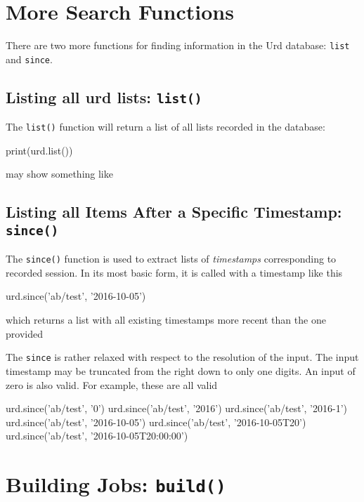 \section{More Search Functions}
\label{sec:more_urd_search}

There are two more functions for finding information in the Urd
database: \texttt{list} and \texttt{since}.


\subsection{Listing all urd lists:  \texttt{list()}}
The \texttt{list()} function will return a list of all lists recorded in
the database:
\begin{python}
print(urd.list())
\end{python}
may show something like
\begin{shell}
\end{shell}


\subsection{Listing all Items After a Specific Timestamp:  \texttt{since()}}
The \texttt{since()} function is used to extract lists of \textsl{timestamps}
corresponding to recorded session.  In its most basic form, it is called
with a timestamp like this
\begin{python}
urd.since('ab/test', '2016-10-05')
\end{python}
which returns a list with all existing timestamps more recent than the
one provided
\begin{shell}
['2016-10-06', '2016-10-07', '2016-10-08', '2016-10-09', '2016-10-09T20']
\end{shell}
The \texttt{since} is rather relaxed with respect to the resolution of
the input.  The input timestamp may be truncated from the right down
to only one digits.  An input of zero is also valid.  For example,
these are all valid
\begin{python}
urd.since('ab/test', '0')
urd.since('ab/test', '2016')
urd.since('ab/test', '2016-1')
urd.since('ab/test', '2016-10-05')
urd.since('ab/test', '2016-10-05T20')
urd.since('ab/test', '2016-10-05T20:00:00')
\end{python}



\section{Building Jobs: \texttt{build()}}
\label{sec:urd_build}

